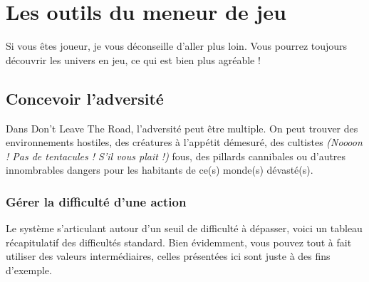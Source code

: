 \chapter{Les outils du meneur de jeu}
\newpage

Si vous êtes joueur, je vous déconseille d'aller plus loin. Vous pourrez toujours découvrir les univers en jeu, ce qui est bien plus agréable !

\section{Concevoir l'adversité}

Dans Don't Leave The Road, l'adversité peut être multiple. On peut trouver des environnements hostiles, des créatures à l'appétit démesuré, des cultistes \emph{(Noooon ! Pas de tentacules ! S'il vous plait !)} fous, des pillards cannibales ou d'autres innombrables dangers pour les habitants de ce(s) monde(s) dévasté(s).

\subsection{Gérer la difficulté d'une action}

Le système s'articulant autour d'un seuil de difficulté à dépasser, voici un tableau récapitulatif des difficultés standard. Bien évidemment, vous pouvez tout à fait utiliser des valeurs intermédiaires, celles présentées ici sont juste à des fins d'exemple.

